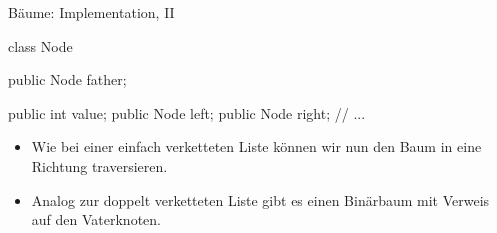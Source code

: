 \begin{frame}[fragile]{Bäume: Implementation, II}
    \pause{}
    \begin{minipage}{0.4\linewidth}
\small%
\begin{plainjava}
class Node {
    public Node father;

    public int value;
    public Node left;
    public Node right;
    // ...
}
\end{plainjava}
    \end{minipage}\hfill{}\pause{}\begin{minipage}{0.55\linewidth}%
\centering{}
\end{minipage}\vfill
    \begin{itemize}[<+(1)->]
        \item Wie bei einer einfach verketteten Liste können wir nun den Baum in eine Richtung traversieren.
        \item Analog zur doppelt verketteten Liste gibt es einen Binärbaum mit Verweis auf den Vaterknoten.
    \end{itemize}
\end{frame}

